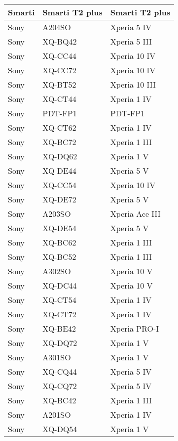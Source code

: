 \begin{tabularx}{\linewidth}{|l|X|X|}
        Smarti & Smarti T2 plus & Smarti T2 plus \\ \hline
        Sony & A204SO & Xperia 5 IV \\ \hline
        Sony & XQ-BQ42 & Xperia 5 III \\ \hline
        Sony & XQ-CC44 & Xperia 10 IV \\ \hline
        Sony & XQ-CC72 & Xperia 10 IV \\ \hline
        Sony & XQ-BT52 & Xperia 10 III \\ \hline
        Sony & XQ-CT44 & Xperia 1 IV \\ \hline
        Sony & PDT-FP1 & PDT-FP1 \\ \hline
        Sony & XQ-CT62 & Xperia 1 IV \\ \hline
        Sony & XQ-BC72 & Xperia 1 III \\ \hline
        Sony & XQ-DQ62 & Xperia 1 V \\ \hline
        Sony & XQ-DE44 & Xperia 5 V \\ \hline
        Sony & XQ-CC54 & Xperia 10 IV \\ \hline
        Sony & XQ-DE72 & Xperia 5 V \\ \hline
        Sony & A203SO & Xperia Ace III \\ \hline
        Sony & XQ-DE54 & Xperia 5 V \\ \hline
        Sony & XQ-BC62 & Xperia 1 III \\ \hline
        Sony & XQ-BC52 & Xperia 1 III \\ \hline
        Sony & A302SO & Xperia 10 V \\ \hline
        Sony & XQ-DC44 & Xperia 10 V \\ \hline
        Sony & XQ-CT54 & Xperia 1 IV \\ \hline
        Sony & XQ-CT72 & Xperia 1 IV \\ \hline
        Sony & XQ-BE42 & Xperia PRO-I \\ \hline
        Sony & XQ-DQ72 & Xperia 1 V \\ \hline
        Sony & A301SO & Xperia 1 V \\ \hline
        Sony & XQ-CQ44 & Xperia 5 IV \\ \hline
        Sony & XQ-CQ72 & Xperia 5 IV \\ \hline
        Sony & XQ-BC42 & Xperia 1 III \\ \hline
        Sony & A201SO & Xperia 1 IV \\ \hline
        Sony & XQ-DQ54 & Xperia 1 V \\ \hline

\end{tabularx}
